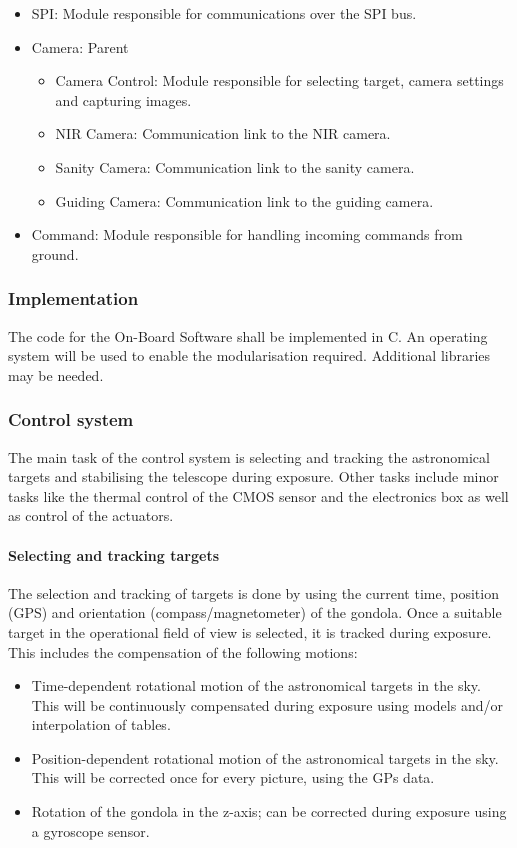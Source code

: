\begin{itemize}
	\item SPI: Module responsible for communications over the SPI bus.

	\item Camera: Parent
		\begin{itemize}
			\item Camera Control: Module responsible for selecting target, camera settings and capturing images.
			\item NIR Camera: Communication link to the NIR camera.
			\item Sanity Camera: Communication link to the sanity camera.
			\item Guiding Camera: Communication link to the guiding camera.
		\end{itemize}
		
	\item Command: Module responsible for handling incoming commands from ground.
		
\end{itemize}

\subsubsection{Implementation}

The code for the On-Board Software shall be implemented in C. An operating system will be used to enable the modularisation required. Additional libraries may be needed. 

\subsubsection{Control system}
The main task of the control system is selecting and tracking the astronomical targets and stabilising the telescope during exposure. Other tasks include minor tasks like the thermal control of the CMOS sensor and the electronics box as well as control of the actuators.

\paragraph{Selecting and tracking targets} 

The selection and tracking of targets is done by using the current time, position (GPS) and orientation (compass/magnetometer) of the gondola. Once a suitable target in the operational field of view is selected, it is tracked during exposure. This includes the compensation of the following motions: 
\begin{itemize}
	\item Time-dependent rotational motion of the astronomical targets in the sky. This will be continuously compensated during exposure using models and/or interpolation of tables.
	\item Position-dependent rotational motion of the astronomical targets in the sky. This will be corrected once for every picture, using the GPs data.
	\item Rotation of the gondola in the z-axis; can be corrected during exposure using a gyroscope sensor.
\end{itemize}

